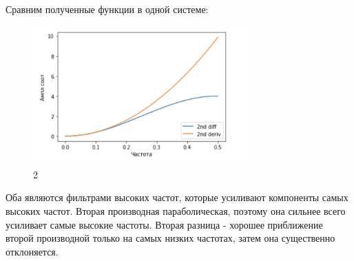 \documentclass[10pt,a4paper,oneside]{article}
\begin{document}
Сравним полученные функции в одной системе:

\begin{figure}[H]
        \centering
        \includegraphics[width=0.75\textwidth]{pics/19.png}
        \caption{2}
        \label{fig:first}
\end{figure}

Оба являются фильтрами высоких частот, которые усиливают компоненты самых высоких частот. Вторая производная параболическая, поэтому она сильнее всего усиливает самые высокие частоты. Вторая разница - хорошее приближение второй производной только на самых низких частотах, затем она существенно отклоняется.
\end{document}

